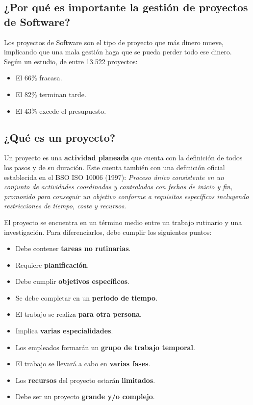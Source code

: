 \documentclass[12pt]{article}
\begin{document}
\subsection[¿Por qué es importante la gestión de proyectos de Software?]{¿Por qué es importante la gestión de proyectos de Software?}
\label{1.2.0}

{Los proyectos de Software son el tipo de proyecto que más dinero mueve, implicando que una mala gestión haga que se pueda perder todo ese dinero. Según un estudio, de entre 13.522 proyectos:}

\begin{itemize}
    \item {El 66\% fracasa.}
    \item {El 82\% terminan tarde.}
    \item {El 43\% excede el presupuesto.}
\end{itemize}

\subsection{¿Qué es un proyecto?}
\label{1.3.0}

{Un proyecto es una \textbf{actividad planeada} que cuenta con la definición de todos los pasos y de su duración. Este cuenta también con una definición oficial establecida en el BSO ISO 10006 (1997): \textit{Proceso único consistente en un conjunto de actividades coordinadas y controladas con fechas de inicio y fin, promovido para conseguir un objetivo conforme a requisitos específicos incluyendo restricciones de tiempo, coste y recursos}.} \bigskip

{El proyecto se encuentra en un término medio entre un trabajo rutinario y una investigación. Para diferenciarlos, debe cumplir los siguientes puntos:}

\begin{itemize}
    \item {Debe contener \textbf{tareas no rutinarias}.}
    \item {Requiere \textbf{planificación}.}
    \item {Debe cumplir \textbf{objetivos específicos}.}
    \item {Se debe completar en un \textbf{periodo de tiempo}.}
    \item {El trabajo se realiza \textbf{para otra persona}.}
    \item {Implica \textbf{varias especialidades}.}
    \item {Los empleados formarán un \textbf{grupo de trabajo temporal}.}
    \item {El trabajo se llevará a cabo en \textbf{varias fases}.}
    \item {Los \textbf{recursos} del proyecto estarán \textbf{limitados}.}
    \item {Debe ser un proyecto \textbf{grande y/o complejo}.}
\end{itemize}
\end{document}
